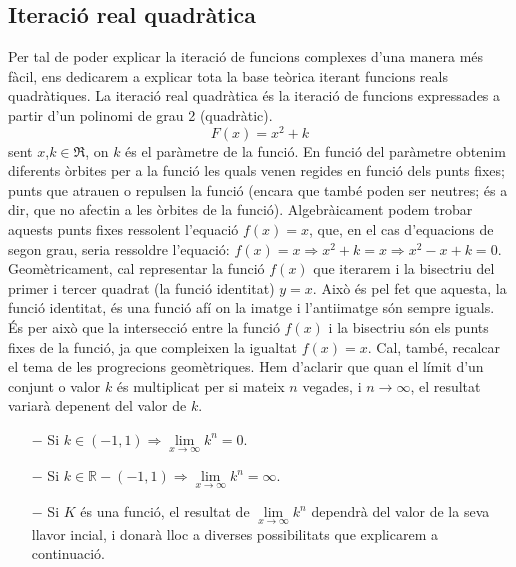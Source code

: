 \documentclass[12pt]{report}
\begin{document}
\subsection{Iteració real quadràtica} 
Per tal de poder explicar la iteració de funcions complexes d'una manera més fàcil, ens dedicarem a explicar tota la base teòrica iterant funcions reals quadràtiques.
\newline
\newline
La iteració real quadràtica és la iteració de funcions expressades a partir d'un polinomi de grau 2 (quadràtic). $$F(x)= x^2 +k$$ sent $x$,$k \in \Re$, on $k$ és el paràmetre de la funció.
\newline
En funció del paràmetre obtenim diferents òrbites per a la funció les quals venen regides en funció dels punts fixes; punts que atrauen o repulsen la funció (encara que també poden ser neutres; és a dir, que no afectin a les òrbites de la funció).
\newline
Algebràicament podem trobar aquests punts fixes ressolent l'equació $f(x) = x$, que, en el cas d'equacions de segon grau, seria ressoldre l'equació: $f(x)=x \Rightarrow x^2+k = x \Rightarrow x^2-x+k = 0$.
\newline
Geomètricament, cal representar la funció $f(x)$ que iterarem i la bisectriu del primer i tercer quadrat (la funció identitat) $y=x$. Això és pel fet que aquesta, la funció identitat, és una funció afí on la imatge i l'antiimatge són sempre iguals. És per això que la intersecció entre la funció $f(x)$ i la bisectriu són els punts fixes de la funció, ja que compleixen la igualtat $f(x)=x$.
\newline
Cal, també, recalcar el tema de les progrecions geomètriques. Hem d'aclarir que quan el límit d'un conjunt o valor $k$ és multiplicat per si mateix $n$ vegades, i $n\rightarrow \infty$, el resultat variarà depenent del valor de $k$. 
\begin{itemize}
    \item [$-$]Si $k\in(-1,1)\Rightarrow\lim\limits_{x \rightarrow \infty}k^n=0$.
    \item [$-$]Si $k\in \mathbb{R}-(-1,1)\Rightarrow\lim\limits_{x \rightarrow \infty}k^n=\infty$.
    \item [$-$] Si $K$ és una funció, el resultat de $\lim\limits_{x \rightarrow \infty}k^n$ dependrà del valor de la seva llavor incial, i donarà lloc a diverses possibilitats que explicarem a continuació.
\end{itemize}
\end{document}
